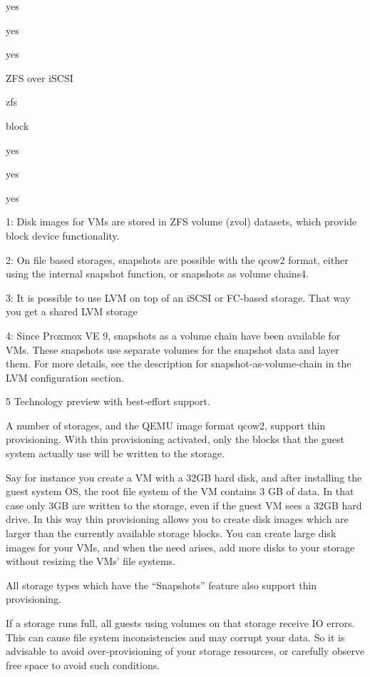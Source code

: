 yes

yes

yes

ZFS over iSCSI

zfs

block

yes

yes

yes

1: Disk images for VMs are stored in ZFS volume (zvol) datasets, which provide block device functionality.

2: On file based storages, snapshots are possible with the qcow2 format, either using the internal snapshot function, or snapshots as volume chains4.

3: It is possible to use LVM on top of an iSCSI or FC-based storage. That way you get a shared LVM storage

4: Since Proxmox VE 9, snapshots as a volume chain have been available for VMs. These snapshots use separate volumes for the snapshot data and layer them. For more details, see the description for snapshot-as-volume-chain in the LVM configuration section.

5 Technology preview with best-effort support.

A number of storages, and the QEMU image format qcow2, support thin provisioning. With thin provisioning activated, only the blocks that the guest system actually use will be written to the storage.

Say for instance you create a VM with a 32GB hard disk, and after installing the guest system OS, the root file system of the VM contains 3 GB of data. In that case only 3GB are written to the storage, even if the guest VM sees a 32GB hard drive. In this way thin provisioning allows you to create disk images which are larger than the currently available storage blocks. You can create large disk images for your VMs, and when the need arises, add more disks to your storage without resizing the VMs' file systems.

All storage types which have the “Snapshots” feature also support thin provisioning.

If a storage runs full, all guests using volumes on that storage receive IO errors. This can cause file system inconsistencies and may corrupt your data. So it is advisable to avoid over-provisioning of your storage resources, or carefully observe free space to avoid such conditions.

\begin{table}[htbp]

\centering

\begin{tabular}

\end{tabular}

\end{table}


